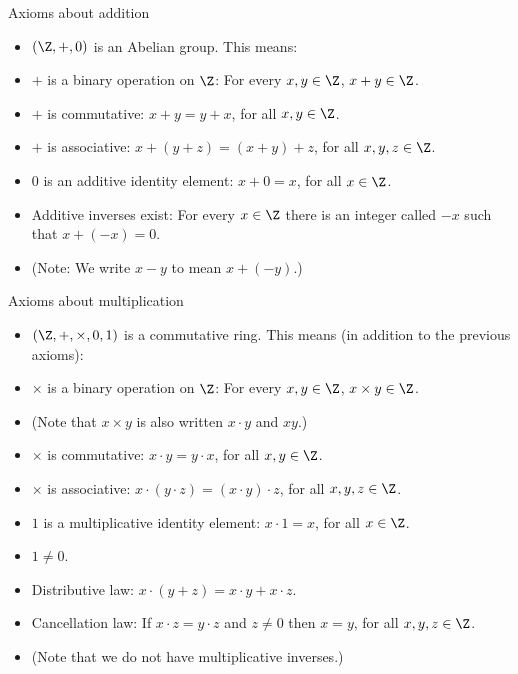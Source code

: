 \documentclass[handout]{beamer}
\begin{document}
\begin{frame}{Axioms about addition}

\begin{itemize}
  \item $\left(\Z, +, 0\right)$ is an Abelian group. This means:
  \item  $+$ is a binary operation on $\Z$: For every $x,y\in\Z$, $x+y\in\Z$.
  \item  $+$ is commutative: $x+y=y+x$, for all $x,y\in\Z$.
  \item  $+$ is associative: $x + (y+z) = (x+y) +z$, for all $x,y,z\in\Z$.
  \item  $0$ is an additive identity element: $x+0 = x$, for all $x\in\Z$.
  \item  Additive inverses exist: For every $x\in\Z$ there is an integer called $-x$ such that $x+(-x) = 0$.
  \item  (Note: We write $x-y$ to mean $x+(-y)$.)
\end{itemize}

\end{frame}

\begin{frame}{Axioms about multiplication}

\begin{itemize}
  \item $\left(\Z, +, \times, 0, 1\right)$ is a commutative ring. This means (in addition to the previous axioms):
  \item  $\times$ is a binary operation on $\Z$: For every $x,y\in\Z$, $x\times y\in\Z$.
  \item (Note that $x\times y$ is also written $x\cdot y$ and $x y$.)
  \item  $\times$ is commutative: $x\cdot y= y \cdot x$, for all $x,y\in\Z$.
  \item  $\times $ is associative: $x \cdot (y\cdot z) = (x\cdot y) \cdot z$, for all $x,y,z\in\Z$.
  \item  $1$ is a multiplicative identity element: $x\cdot 1 = x$, for all $x\in\Z$.
  \item $1\not=0$.
  \item Distributive law: $x\cdot (y + z) = x \cdot y + x \cdot z$.
  \item Cancellation law: If $x\cdot z = y \cdot z$ and $z\not=0$ then $x=y$, for all $x,y,z\in\Z$.
  \item  (Note that we do not have multiplicative inverses.)
\end{itemize}

\end{frame}
\end{document}
